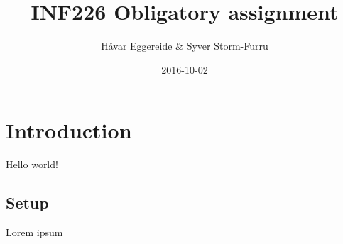 \documentclass{article}
\title{INF226 Obligatory assignment}
\date{2016-10-02}
\author{Håvar Eggereide & Syver Storm-Furru}
\begin{document}
\maketitle
{}
\newpage
{}
\section{Introduction}

  Hello world!

\subsection{Setup}

  Lorem ipsum
\end{document}

